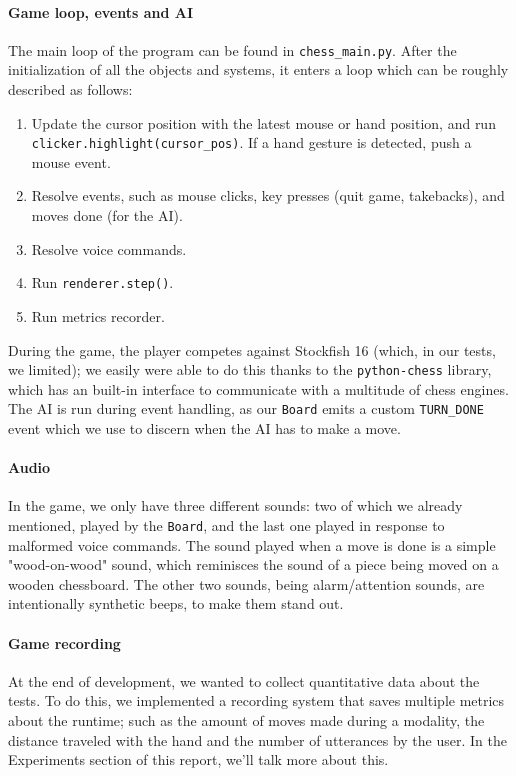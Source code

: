 \documentclass[a4paper, 11pt, twocolumn]{IEEEtran}
\begin{document}
    \paragraph*{Game loop, events and AI} The main loop of the program can be found in \texttt{chess\_main.py}. After the initialization of all the objects and systems, it enters a loop which can be roughly described as follows:
    \begin{enumerate}
        \item Update the cursor position with the latest mouse or hand position, and run \texttt{clicker.highlight(cursor\_pos)}. If a hand gesture is detected, push a mouse event.
        \item Resolve events, such as mouse clicks, key presses (quit game, takebacks), and moves done (for the AI).
        \item Resolve voice commands.
        \item Run \texttt{renderer.step()}.
        \item Run metrics recorder.
    \end{enumerate}
    During the game, the player competes against Stockfish 16 (which, in our tests, we limited); we easily were able to do this thanks to the \texttt{python-chess} library, which has an built-in interface to communicate with a multitude of chess engines. The AI is run during event handling, as our \texttt{Board} emits a custom \texttt{TURN\_DONE} event which we use to discern when the AI has to make a move.
    \paragraph*{Audio} In the game, we only have three different sounds: two of which we already mentioned, played by the \texttt{Board}, and the last one played in response to malformed voice commands. The sound played when a move is done is a simple "wood-on-wood" sound, which reminisces the sound of a piece being moved on a wooden chessboard. The other two sounds, being alarm/attention sounds, are intentionally synthetic beeps, to make them stand out.
    \paragraph*{Game recording} At the end of development, we wanted to collect quantitative data about the tests. To do this, we implemented a recording system that saves multiple metrics about the runtime; such as the amount of moves made during a modality, the distance traveled with the hand and the number of utterances by the user. In the Experiments section of this report, we'll talk more about this.
\end{document}
